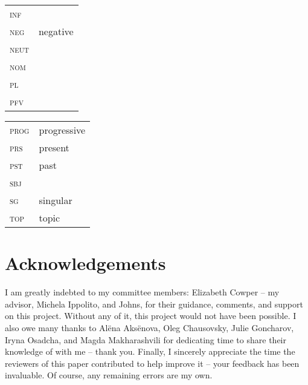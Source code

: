 \documentclass[output=paper,modfonts,newtxmath,hidelinks,]{langscibook}
\begin{document}
\begin{tabularx}{.5\textwidth}{@{}lQ@{}}
\textsc{inf}&\\
\textsc{neg}&negative\\
\textsc{neut}&\\
\textsc{nom}&\\
\textsc{pl}&\\
\textsc{pfv}&\\
\end{tabularx}%
\begin{tabularx}{.5\textwidth}{@{}lQ@{}}
\textsc{prog}&progressive\\
\textsc{prs}&present\\
\textsc{pst}&past\\
\textsc{sbj}&\\
\textsc{sg}&singular\\
\textsc{top}&topic\\ 
\end{tabularx}

\section*{Acknowledgements}
I am greatly indebted to my committee members: Elizabeth Cowper -- my advisor, Michela Ippolito, and  Johns, for their guidance, comments, and support on this project. Without any of it, this project would not have been possible. I also owe many thanks to Alëna Aksënova, Oleg Chausovsky, Julie Goncharov, Iryna Osadcha, and Magda Makharashvili for dedicating time to share their knowledge of  with me -- thank you. Finally, I sincerely appreciate the time the reviewers of this paper contributed to help improve it -- your feedback has been invaluable. Of course, any remaining errors are my own.


\sloppy
\printbibliography[heading=subbibliography,notkeyword=this]
\end{document}
